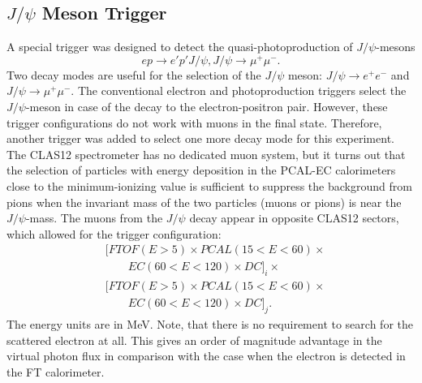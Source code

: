 \subsection{$J/\psi$ Meson Trigger}
\label{sec:meson_trigger}
A special trigger was designed to detect the quasi-photoproduction of $J/\psi$-mesons
$$
ep \to e' p' J/\psi, J/\psi \to \mu^+\mu^-.
$$
Two decay modes are useful for the selection of the $J/\psi$ meson: $J/\psi \to e^+e^-$ and $J/\psi \to \mu^+\mu^-$.
The conventional electron and photoproduction triggers  select the $J/\psi$-meson  in case of the decay to the electron-positron pair. However, these trigger configurations do not  work  with muons in the final state. Therefore, another trigger was added to select one more decay mode for this experiment. The CLAS12 spectrometer has no dedicated muon system, but it turns out that the selection of particles with energy deposition in the PCAL-EC calorimeters close to the minimum-ionizing  value is sufficient to suppress the background from pions when the invariant mass of the two particles (muons or pions) is near the $J/\psi$-mass. The muons from the $J/\psi$ decay appear in opposite CLAS12 sectors, which allowed for the trigger configuration:  
\begin{align*} 
 & [FTOF(E{{>}}5){\times}  PCAL(15{<}E{<}60){\times} \\
 & {\qquad} EC(60{<}E{<}120){\times}   DC]_i {\times} \\
 & [FTOF(E{{>}}5){\times}  PCAL(15{<}E{<}60){\times} \\
 & {\qquad} EC(60{<}E{<}120){\times}   DC]_j  .
\end{align*}
\noindent
The energy units are in MeV. Note, that there is no requirement to search for the scattered electron at all. This gives an order of magnitude advantage in the  virtual photon flux in comparison with the case when the electron is detected in the FT calorimeter.
